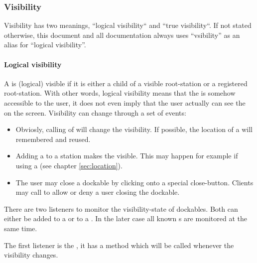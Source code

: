 
\subsubsection{Visibility}
Visibility has two meanings, ``logical visibility`` and ``true visibility``. If not stated otherwise, this document and all documentation always uses ``vsibility'' as an alias for ``logical visibility''.

\paragraph{Logical visibility}
A  is (logical) visible if it is either a child of a visible root-station or a registered root-station. With other words, logical visibility means that the  is somehow accessible to the user, it does not even imply that the user actually can see the  on the screen. Visibility can change through a set of events:
\begin{itemize}
 \item Obviosly, calling  of  will change the visibility. If possible, the location of a  will remembered and reused.
 \item Adding a  to a station makes the  visible. This may happen for example if using a  (see chapter \ref{sec:location}).
 \item The user may close a dockable by clicking onto a special close-button. Clients may call  to allow or deny a user closing the dockable.
\end{itemize}

There are two listeners to monitor the visibility-state of dockables. Both can either be added to a  or to a . In the later case all known s are monitored at the same time.

The first listener is the , it has a method \linebreak {} which will be called whenever the visibility changes.

